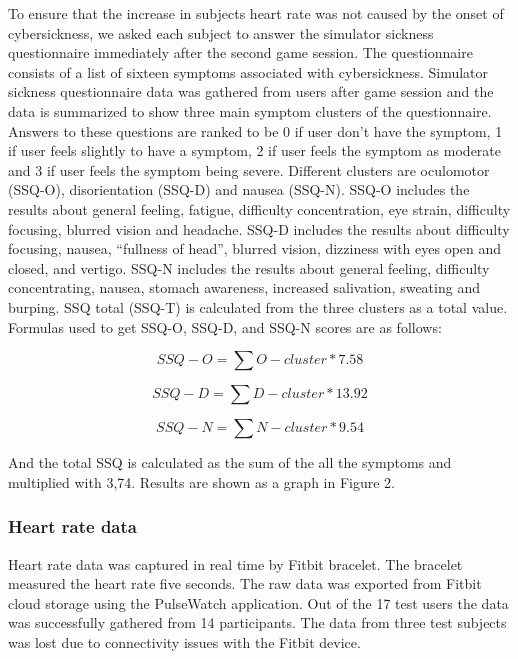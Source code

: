 \documentclass{sig-alternate-05-2015}
\begin{document}
To ensure that the increase in subjects heart rate was not caused by the onset of cybersickness, 
we asked each subject to answer the simulator sickness questionnaire immediately after the second 
game session. The questionnaire consists of a list of sixteen symptoms associated with cybersickness. 
Simulator sickness questionnaire data was gathered from users after game session and the data is 
summarized to show three main symptom clusters of the questionnaire. Answers to these questions are 
ranked to be 0 if user don’t have the symptom, 1 if user feels slightly to have a symptom, 2 if user feels the symptom as moderate and 3 if user feels the symptom being severe. 
Different clusters are oculomotor (SSQ-O), disorientation (SSQ-D) and nausea (SSQ-N). SSQ-O 
includes the results about general feeling, fatigue, difficulty concentration, eye strain, 
difficulty focusing, blurred vision and headache. SSQ-D includes the results about difficulty 
focusing, nausea, “fullness of head”, blurred vision, dizziness with eyes open and closed, 
and vertigo. SSQ-N includes the results about general feeling, difficulty concentrating, 
nausea, stomach awareness, increased salivation, sweating and burping. SSQ total (SSQ-T) is 
calculated from the three clusters as a total value. Formulas used to get SSQ-O, SSQ-D, and 
SSQ-N scores are as follows:

\begin{equation}SSQ-O = \sum{O-cluster} * 7.58\end{equation}

\begin{equation}SSQ-D = \sum{D-cluster} * 13.92\end{equation}

\begin{equation}SSQ-N = \sum{N-cluster} * 9.54\end{equation}

And the total SSQ is calculated as the sum of the all the symptoms and multiplied with 3,74. 
Results are shown as a graph in Figure 2.

\subsubsection{Heart rate data}
Heart rate data was captured in real time by Fitbit bracelet. The bracelet 
measured the heart rate five seconds. The raw data was exported from Fitbit 
cloud storage using the PulseWatch application. Out of the 17 test users the 
data was successfully gathered from 14 participants. The data from three test 
subjects was lost due to connectivity issues with the Fitbit device. 
\end{document}
